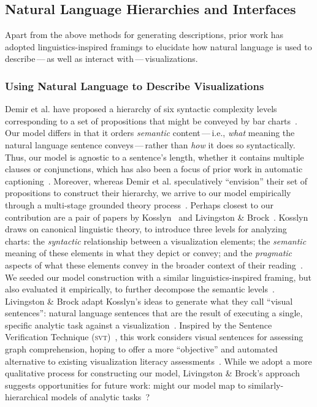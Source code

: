 \subsection{Natural Language Hierarchies and Interfaces}

Apart from the above methods for generating descriptions, prior work has adopted linguistics-inspired framings to elucidate how natural language is used to {describe}\,---\,as well as {interact with}\,---\,visualizations.

\subsubsection{Using Natural Language to Describe Visualizations}

Demir et al. have proposed a hierarchy of six syntactic complexity levels corresponding to a set of propositions that might be conveyed by bar charts~\cite{demir_summarizing_2012}.
Our model differs in that it orders \emph{semantic} content\,---\,i.e., \emph{what} meaning the natural language sentence conveys\,---\,rather than \emph{how} it does so syntactically. 
Thus, our model is agnostic to a sentence’s length, whether it contains multiple clauses or conjunctions, which has also been a focus of prior work in automatic captioning~\cite{qian_formative_2020}.
Moreover, whereas Demir et al. speculatively ``envision'' their set of propositions to construct their hierarchy, we arrive to our model empirically through a multi-stage grounded theory process~.
Perhaps closest to our contribution are a pair of papers by Kosslyn~\cite{kosslyn_understanding_1989} and Livingston \& Brock~\cite{livingston_position_2020}.
Kosslyn draws on canonical linguistic theory, to introduce three levels for analyzing charts: the \emph{syntactic} relationship between a visualization elements; the \emph{semantic} meaning of these elements in what they depict or convey; and the \emph{pragmatic} aspects of what these elements convey in the broader context of their reading~\cite{kosslyn_understanding_1989}.
We seeded our model construction with a similar linguistics-inspired framing, but also evaluated it empirically, to further decompose the semantic levels~.
Livingston \& Brock adapt Kosslyn's ideas to generate what they call ``visual sentences'': natural language sentences that are the result of executing a single, specific analytic task against a visualization~\cite{livingston_position_2020}.
Inspired by the Sentence Verification Technique (\textsc{svt})~\cite{royer_sentence_1979, royer_developing_2001}, this work considers visual sentences for assessing graph comprehension, hoping to offer a more ``objective'' and automated alternative to existing visualization literacy assessments~\cite{lee_vlat_2016, galesic_graph_2011}.
While we adopt a more qualitative process for constructing our model, Livingston \& Brock's approach suggests opportunities for future work: might our model map to similarly-hierarchical models of analytic tasks~\cite{brehmer_multi-level_2013, amar_low-level_2005}?


